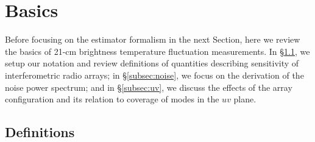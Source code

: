 \section{Basics}
\label{sec:basics}

Before focusing on the estimator formalism in the next Section, here we review the basics of 21-cm brightness temperature fluctuation measurements. In \S\ref{subsec:def}, we setup our notation and review definitions of quantities describing sensitivity of interferometric radio arrays; in \S\ref{subsec:noise}, we focus on the derivation of the noise power spectrum; and in \S\ref{subsec:uv}, we discuss the effects of the array configuration and its relation to coverage of modes in the $uv$ plane. 

\subsection{Definitions}
\label{subsec:def}

